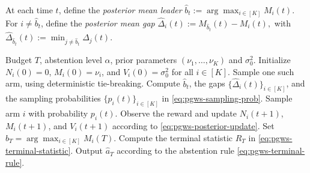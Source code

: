 \documentclass[10pt]{article}
\newcommand{\ouralgfull}{\textsc{Posterior Gap Weighted Sampling with Abstention}}
\newcommand{\ouralg}{{\textnormal{\textsc{PGWS}}}}
\theoremstyle{plain}
\begin{document}
At each time \(t\), define the \emph{posterior mean leader}
    $\widehat b_t
    :=
    \arg\max_{i\in[K]} M_i(t)$.
For \(i\neq \widehat b_t\), define the
\emph{posterior mean gap}
    $\widehat\Delta_i(t)
    :=
    M_{\widehat b_t}(t)-M_i(t),$
     with $\widehat\Delta_{\widehat b_t}(t)
    :=
    \min_{j\neq \widehat b_t}
    \widehat\Delta_j(t)$.

\begin{algorithm}[t]
\caption{\ouralgfull{} (\ouralg{}$(\alpha)$)}
\label{alg:pgws}
\begin{algorithmic}[1]
\Require Budget \(T\), abstention level \(\alpha\), prior parameters
\((\nu_1,\ldots,\nu_K)\) and \(\sigma_0^2\).
\State Initialize \(N_i(0)=0\), \(M_i(0)=\nu_i\), and
\(V_i(0)=\sigma_0^2\) for all \(i\in[K]\).
        \State Sample one such arm, using deterministic tie-breaking.
    \Else
        \State Compute \(\widehat b_t\), the gaps
        \(\{\widehat\Delta_i(t)\}_{i\in[K]}\), and the sampling probabilities
        \(\{p_i(t)\}_{i\in[K]}\) in \eqref{eq:pgws-sampling-prob}.
        \State Sample arm \(i\) with probability \(p_i(t)\).
    \EndIf
    \State Observe the reward and update \(N_i(t+1)\), \(M_i(t+1)\), and
    \(V_i(t+1)\) according to \eqref{eq:pgws-posterior-update}.
\EndFor
\State Set \(\widehat b_T=\arg\max_{i\in[K]}M_i(T)\).
\State Compute the terminal statistic \(R_T\) in
\eqref{eq:pgws-terminal-statistic}.
\State Output \(\hat a_T\) according to the abstention rule
\eqref{eq:pgws-terminal-rule}.
\end{algorithmic}
\end{algorithm}
\end{document}
